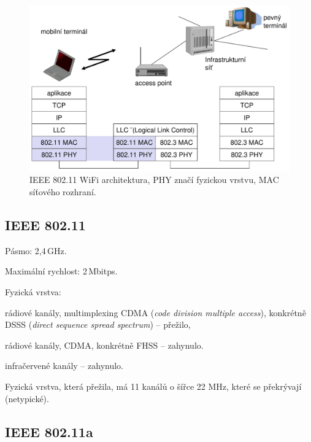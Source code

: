 \begin{figure}[H]
    \centering
    \includegraphics[width=0.75\linewidth]{wifi-architektura.pdf}
    \caption{IEEE 802.11 WiFi architektura, PHY značí fyzickou vrstvu, MAC síťového rozhraní.}
\end{figure}

\subsection{IEEE 802.11}

\begin{compactitem}
    \item Pásmo: 2,4\,GHz.

    \item Maximální rychlost: 2\,Mbitps.

    \item Fyzická vrstva: \begin{compactitem}
        \item rádiové kanály, multimplexing CDMA (\textit{code division multiple access}), konkrétně DSSS (\textit{direct sequence spread spectrum}) -- přežilo,
        \item rádiové kanály, CDMA, konkrétně FHSS -- zahynulo.
        \item infračervené kanály -- zahynulo.
    \end{compactitem}

    \item Fyzická vrstva, která přežila, má 11 kanálů o šířce 22 MHz, které se překrývají (netypické).
\end{compactitem}

\subsection{IEEE 802.11a}

